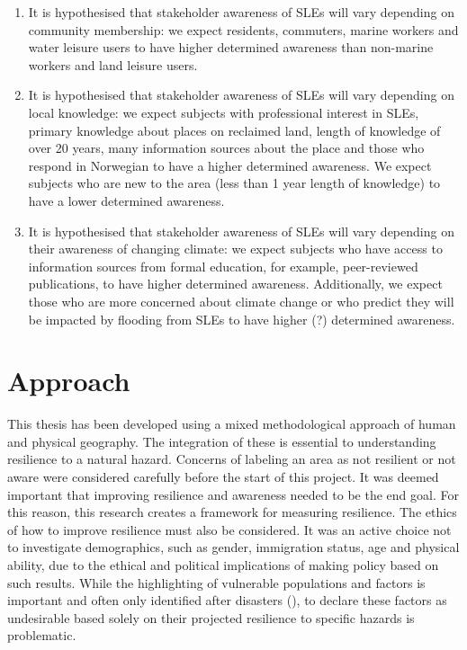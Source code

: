 \begin{enumerate}
    \item It is hypothesised that stakeholder awareness of SLEs will vary depending on community membership: we expect residents, commuters, marine workers and water leisure users to have higher determined awareness than non-marine workers and land leisure users.
  
    \item It is hypothesised that stakeholder awareness of SLEs will vary depending on local knowledge: we expect subjects with professional interest in SLEs,  primary knowledge about places on reclaimed land, length of knowledge of over 20 years, many information sources about the place and those who respond in Norwegian to have a higher determined awareness. We expect subjects who are new to the area (less than 1 year length of knowledge) to have a lower determined awareness.

    \item It is hypothesised that stakeholder awareness of SLEs will vary depending on their awareness of changing climate: we expect subjects who have access to information sources from formal education, for example, peer-reviewed publications, to have higher determined awareness. Additionally, we expect those who are more concerned about climate change or who predict they will be impacted by flooding from SLEs to have higher (?) determined awareness. 
\end{enumerate}

\section{Approach}

This thesis has been developed using a mixed methodological approach of human and physical geography. The integration of these is essential to understanding resilience to a natural hazard. Concerns of labeling an area as not resilient or not aware were considered carefully before the start of this project.  It was deemed important that improving resilience and awareness needed to be the end goal. For this reason, this research creates a framework for measuring resilience. The ethics of how to improve resilience must also be considered. It was an active choice not to investigate demographics, such as gender, immigration status, age and physical ability, due to the ethical and political implications of making policy based on such results. While the highlighting of vulnerable populations and factors is important and often only identified after disasters (\cite{cutter_community_2020}), to declare these factors as undesirable based solely on their projected resilience to specific hazards is problematic. 

